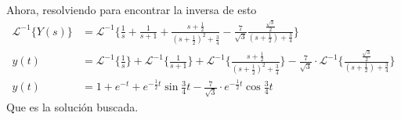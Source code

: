 \documentclass{article}
\begin{document}
\begin{enumerate}
{            Ahora, resolviendo para encontrar la inversa de esto
            \begin{align*}
                \mathcal{L}^{-1}\{Y(s)\} 
                &= \mathcal{L}^{-1}\{
                    \frac{1}{s} + \frac{1}{s+1}
                    + \frac{s+\frac{1}{2}}{(s+\frac{1}{2})^2+\frac{3}{4}}
                    - \frac{7}{\sqrt{3}}\frac{\frac{\sqrt{3}}{2}}{(s+\frac{1}{2})+\frac{3}{4}}
                \} \\
                y(t) &= \mathcal{L}^{-1}\{\frac{1}{s}\} 
                    + \mathcal{L}^{-1}\{\frac{1}{s+1}\}
                    + \mathcal{L}^{-1}\{\frac{s+\frac{1}{2}}{(s+\frac{1}{2})^2+\frac{3}{4}}\} 
                    - \frac{7}{\sqrt{3}} \cdot \mathcal{L}^{-1}\{\frac{\frac{\sqrt{3}}{2}}{(s+\frac{1}{2})+\frac{3}{4}}\}
                    \\
                y(t) &= 1 + e^{-t} + e^{-\frac{1}{2}t}\sin{\frac{3}{4}t}
                    - \frac{7}{\sqrt{3}}\cdot e^{-\frac{1}{2}t}\cos{\frac{3}{4}t}
            \end{align*}
            Que es la solución buscada.
        }
    \end{enumerate}
\end{document}
